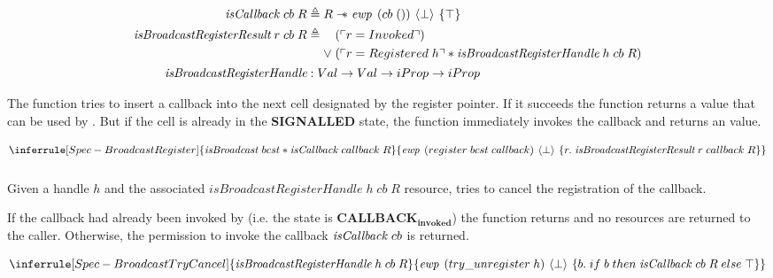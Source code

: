 \begin{align*}
  \gsIsCb{}\; cb\; R                            & \triangleq R \wand \ewp{cb\; ()}{\bot}{\top}                                                           \\
  \emph{isBroadcastRegisterResult}\; r\; cb\; R & \triangleq \begin{aligned}[t]
                                                  & (\ulcorner r = Invoked \urcorner)                                                           \\
                                                \vee\; & (\ulcorner r = Registered\; h \urcorner \ast \emph{isBroadcastRegisterHandle}\; h\; cb\; R) 
                                                \end{aligned}\\
  \emph{isBroadcastRegisterHandle}              & : Val \to Val \to iProp \to iProp
\end{align*}

The  function tries to insert a callback into the next cell designated by the register pointer.
If it succeeds the function returns a  value that can be used by .
But if the cell is already in the \textbf{SIGNALLED} state, the function immediately invokes the callback and returns an  value.

\[
  \inferrule[Spec-BroadcastRegister]
  { \gsIsBcst{}\; bcst \ast \gsIsCb{}\; callback\; R }
  { \ewp{register\; bcst\; callback}{\bot}{r.\; \emph{isBroadcastRegisterResult}\; r\; callback\; R}}
\]

\subsubsection{}
\label{sec:broadcast-spec-cance}

Given a handle \(h\) and the associated \(\textit{isBroadcastRegisterHandle}\; h\; cb\; R\) resource,  tries to cancel the registration of the callback.

If the callback had already been invoked by  (i.e. the state is \(\textbf{CALLBACK}_\textbf{invoked}\)) the function returns  and no resources are returned to the caller.
Otherwise, the permission to invoke the callback \(\mathit{isCallback}{}\; cb\) is returned.

\[
  \inferrule[Spec-BroadcastTryCancel]
  { \emph{isBroadcastRegisterHandle}\; h\; cb\; R }
  { \ewp{try\_unregister\; h}{\bot}{b.\; if\; b\; then\; \gsIsCb{}\; cb\; R\; else\; \top}}
\]

